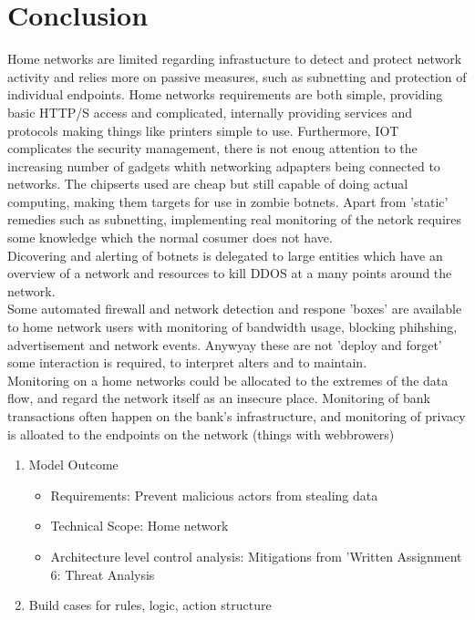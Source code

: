 \documentclass[
	letterpaper, %
	10pt, %
	unnumberedsections, %
	twoside, %
]{APAAssignment}
\begin{document}
\section{Conclusion}
Home networks are limited regarding infrastucture to detect and protect network activity and relies more on passive measures, such as subnetting and protection of individual endpoints. Home networks requirements are both simple, providing basic HTTP/S access and complicated, internally providing services and protocols making things like printers simple to use. Furthermore, IOT complicates the security management, there is not enoug attention to the increasing number of gadgets whith networking adpapters being connected to networks. The chipserts used are cheap but still capable of doing actual computing, making them targets for use in zombie botnets.
Apart from 'static' remedies such as subnetting, implementing real monitoring of the netork requires some knowledge which the normal cosumer does not have. \\
Dicovering and alerting of botnets is delegated to large entities which have an overview of a network and resources to kill DDOS at a many points around the network. \\
Some automated firewall and network detection and respone 'boxes'\cite{FireWallaCommerical} are available to home network users with monitoring of bandwidth usage, blocking phihshing, advertisement and network events. Anywyay these are not 'deploy and forget' some interaction is required, to interpret alters and to maintain. \\
Monitoring on a home networks could be allocated to the extremes of the data flow, and regard the network itself as an insecure place. Monitoring of bank transactions often happen on the bank's infrastructure, and monitoring of privacy is alloated to the endpoints on the network (things with webbrowers)














\begin{enumerate}
	\item Model Outcome
	      \begin{itemize}
		      \item Requirements: Prevent malicious actors from stealing data
		      \item Technical Scope: Home network
		      \item Architecture level control analysis: Mitigations from 'Written Assignment 6: Threat Analysis
	      \end{itemize}

	\item Build cases for rules, logic, action structure


\end{enumerate}
\end{document}

